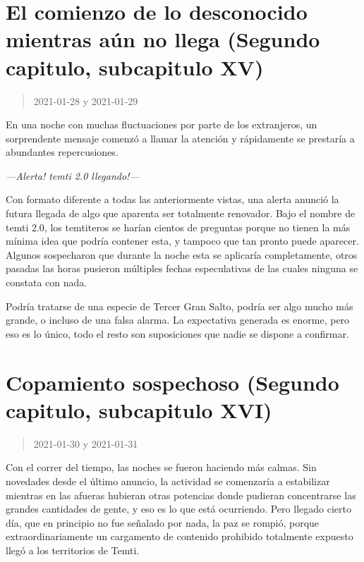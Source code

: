 \documentclass[
  spanish,
]{book}
\begin{document}
\hypertarget{el-comienzo-de-lo-desconocido-mientras-auxfan-no-llega-segundo-capitulo-subcapitulo-xv}{%
\section{El comienzo de lo desconocido mientras aún no llega (Segundo capitulo, subcapitulo XV)}\label{el-comienzo-de-lo-desconocido-mientras-auxfan-no-llega-segundo-capitulo-subcapitulo-xv}}

\begin{quote}
2021-01-28 y 2021-01-29
\end{quote}

En una noche con muchas fluctuaciones por parte de los extranjeros, un sorprendente mensaje comenzó a llamar la atención y rápidamente se prestaría a abundantes repercusiones.

\emph{---Alerta! temti 2.0 llegando!---}

Con formato diferente a todas las anteriormente vistas, una alerta anunció la futura llegada de algo que aparenta ser totalmente renovador. Bajo el nombre de temti 2.0, los temtiteros se harían cientos de preguntas porque no tienen la más mínima idea que podría contener esta, y tampoco que tan pronto puede aparecer. Algunos sospecharon que durante la noche esta se aplicaría completamente, otros pasadas las horas pusieron múltiples fechas especulativas de las cuales ninguna se constata con nada.

Podría tratarse de una especie de Tercer Gran Salto, podría ser algo mucho más grande, o incluso de una falsa alarma. La expectativa generada es enorme, pero eso es lo único, todo el resto son suposiciones que nadie se dispone a confirmar.

\hypertarget{copamiento-sospechoso-segundo-capitulo-subcapitulo-xvi}{%
\section{Copamiento sospechoso (Segundo capitulo, subcapitulo XVI)}\label{copamiento-sospechoso-segundo-capitulo-subcapitulo-xvi}}

\begin{quote}
2021-01-30 y 2021-01-31
\end{quote}

Con el correr del tiempo, las noches se fueron haciendo más calmas. Sin novedades desde el último anuncio, la actividad se comenzaría a estabilizar mientras en las afueras hubieran otras potencias donde pudieran concentrarse las grandes cantidades de gente, y eso es lo que está ocurriendo. Pero llegado cierto día, que en principio no fue señalado por nada, la paz se rompió, porque extraordinariamente un cargamento de contenido prohibido totalmente expuesto llegó a los territorios de Temti.
\end{document}
